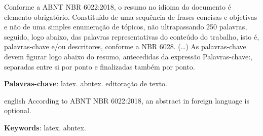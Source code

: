 \documentclass[
	article,			%
	11pt,				%
	oneside,			%
	a4paper,			%
	english,			%
	brazil,				%
	sumario=tradicional
	]{abntex2}
\begin{document}

\frenchspacing


%
%

\maketitle





\begin{resumoumacoluna}
   Conforme a ABNT NBR 6022:2018, o resumo no idioma do documento é elemento obrigatório.
   Constituído de uma sequência de frases concisas e objetivas e não de uma
   simples enumeração de tópicos, não ultrapassando 250 palavras, seguido, logo
   abaixo, das palavras representativas do conteúdo do trabalho, isto é,
   palavras-chave e/ou descritores, conforme a NBR 6028. (\ldots) As
   palavras-chave devem figurar logo abaixo do resumo, antecedidas da expressão
   Palavras-chave:, separadas entre si por ponto e finalizadas também por ponto.

   \vspace{\onelineskip}

   \noindent
   \textbf{Palavras-chave}: latex. abntex. editoração de texto.
\end{resumoumacoluna}


\renewcommand{\resumoname}{Abstract}
\begin{resumoumacoluna}
   \begin{otherlanguage*}{english}
      According to ABNT NBR 6022:2018, an abstract in foreign language is optional.

      \vspace{\onelineskip}

      \noindent
      \textbf{Keywords}: latex. abntex.
   \end{otherlanguage*}
\end{resumoumacoluna}
\end{document}
